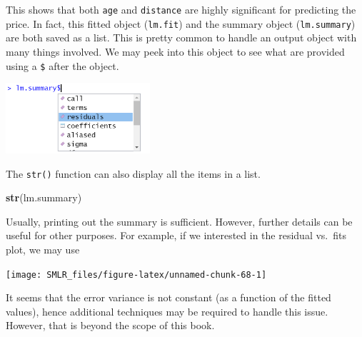 \documentclass[
]{book}
\newenvironment{Shaded}{\begin{snugshade}}{\end{snugshade}}
\newcommand{\AttributeTok}[1]{\textcolor[rgb]{0.13,0.29,0.53}{#1}}
\newcommand{\DecValTok}[1]{\textcolor[rgb]{0.00,0.00,0.81}{#1}}
\newcommand{\FloatTok}[1]{\textcolor[rgb]{0.00,0.00,0.81}{#1}}
\newcommand{\FunctionTok}[1]{\textcolor[rgb]{0.13,0.29,0.53}{\textbf{#1}}}
\newcommand{\NormalTok}[1]{#1}
\newcommand{\SpecialCharTok}[1]{\textcolor[rgb]{0.81,0.36,0.00}{\textbf{#1}}}
\newcommand{\StringTok}[1]{\textcolor[rgb]{0.31,0.60,0.02}{#1}}
\theoremstyle{definition}
\theoremstyle{definition}
\theoremstyle{definition}
\theoremstyle{definition}
\theoremstyle{remark}
\begin{document}
This shows that both \texttt{age} and \texttt{distance} are highly significant for predicting the price. In fact, this fitted object (\texttt{lm.fit}) and the summary object (\texttt{lm.summary}) are both saved as a list. This is pretty common to handle an output object with many things involved. We may peek into this object to see what are provided using a \texttt{\$} after the object.

\includegraphics[width=0.4\textwidth,height=\textheight]{images/reactive.png}

The \texttt{str()} function can also display all the items in a list.

\begin{Shaded}
\begin{Highlighting}[]
    \FunctionTok{str}\NormalTok{(lm.summary)}
\end{Highlighting}
\end{Shaded}

Usually, printing out the summary is sufficient. However, further details can be useful for other purposes. For example, if we interested in the residual vs.~fits plot, we may use

\begin{Shaded}
\end{Shaded}

\begin{center}\texttt{[image: SMLR\_files/figure-latex/unnamed-chunk-68-1]} \end{center}

It seems that the error variance is not constant (as a function of the fitted values), hence additional techniques may be required to handle this issue. However, that is beyond the scope of this book.
\end{document}
